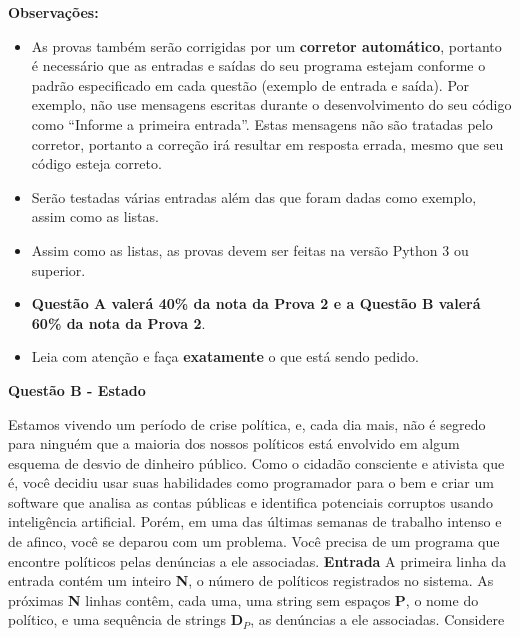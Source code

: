 \documentclass[a4paper, 12pt]{article}
\begin{document}
\textbf{{\large Observações:}}
\begin{itemize}
	\item As provas também serão corrigidas por um \textbf{corretor automático}, portanto é necessário que as entradas e saídas do seu programa estejam conforme o padrão especificado em cada questão (exemplo de entrada e saída). Por exemplo, não use mensagens escritas durante o desenvolvimento do seu código como “Informe a primeira entrada”. Estas mensagens não são tratadas pelo corretor, portanto a correção irá resultar em resposta errada, mesmo que seu código esteja correto.
	\item Serão testadas várias entradas além das que foram dadas como exemplo, assim como as listas.
	\item Assim como as listas, as provas devem ser feitas na versão Python 3 ou superior.
	\item \textbf{Questão A valerá 40\% da nota da Prova 2 e a Questão B valerá 60\% da nota da Prova 2}.
	\item Leia com atenção e faça \textbf{exatamente} o que está sendo pedido.
\end{itemize}
\newpage %
\begin{center}
\textbf{{\Large Questão B - Estado}}
\end{center}
\vspace{5pt}
Estamos vivendo um período de crise política, e, cada dia mais, não é segredo
para ninguém que a maioria dos nossos políticos está envolvido em algum
esquema de desvio de dinheiro público. \newline
Como o cidadão consciente e ativista que é, você decidiu usar suas habilidades
como programador para o bem e criar um software que analisa as contas públicas
e identifica potenciais corruptos usando inteligência artificial. \newline \newline
Porém, em uma das últimas semanas de trabalho intenso e de afinco, você se
deparou com um problema. Você precisa de um programa que encontre políticos
pelas denúncias a ele associadas. \newline \newline
\textbf{{\large Entrada}} \newline
A primeira linha da entrada contém um inteiro \textbf{N}, o número de políticos registrados
no sistema. \newline
As próximas \textbf{N} linhas contêm, cada uma, uma string sem espaços \textbf{P}, o nome do
político, e uma sequência de strings $\textbf{D}_P$, as denúncias a ele associadas. Considere
\end{document}
